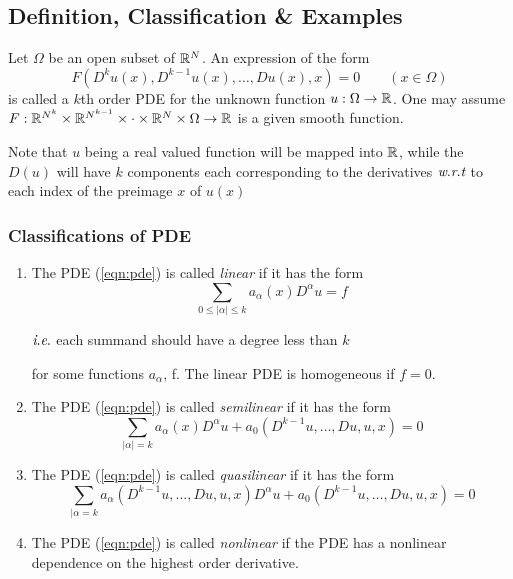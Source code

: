 \subsection{Definition,  Classification \& Examples}
\begin{definition}
    Let $\Omega$ be an open subset of $\mathbb R ^N$. An expression of the form  
        \begin{equation}
            F\left( D^{k} u(x), D^{k-1} u(x), \ldots , Du(x), x \right)=0 \qquad (x\in \Omega)
            \label{eqn:pde}
        \end{equation}
    is called a $k$th order PDE for the unknown function $u:\Omega \to \mathbb R$. One may assume $F: \mathbb R ^{N^k} \times \mathbb R^{N^{k-1}} \times \cdot \times \mathbb R ^N \times \Omega \to \mathbb R$ is a given smooth function.
    \begin{remark}
        Note that $u$ being a real valued function will be mapped into $\mathbb R$, while the $D(u)$ will have $k$ components each corresponding to the derivatives $\textit{w}.\textit{r}.\textit{t}$ to each index of the preimage $x$ of $u(x)$
    \end{remark}
\end{definition}



\subsubsection{Classifications of PDE}
\begin{enumerate}[label=(\roman*)]
    \item The PDE (\ref{eqn:pde}) is called \textit{linear} if it has the form $$\sum_{0\le |\alpha| \le k} a_{\alpha} (x) D^{\alpha} u =f$$ 
    \begin{flushright}
     $\textit{i}.\textit{e}.$ each summand should have a degree less than $k$
    \end{flushright}

	for some functions $a_{ \alpha }$, f. The linear PDE is homogeneous if $f=0$.
\item The PDE (\ref{eqn:pde}) is called \textit{semilinear} if it has the form
    $$\sum_{|\alpha|=k} a_{\alpha}(x) D^{\alpha}u + a_0 \left( D^{k-1}u, \ldots , Du, u, x \right) =0$$
\item The PDE (\ref{eqn:pde}) is called \textit{quasilinear} if it has the form 
    $$\sum_{|\alpha =k} a_{\alpha} (D^{k-1} u, \ldots , Du, u, x) D^{\alpha} u + a_0 \left( D^{k-1} u, \ldots , Du, u, x \right) = 0$$
\item The PDE (\ref{eqn:pde}) is called \textit{nonlinear} if the PDE has a nonlinear dependence on the highest order derivative.

\end{enumerate}

